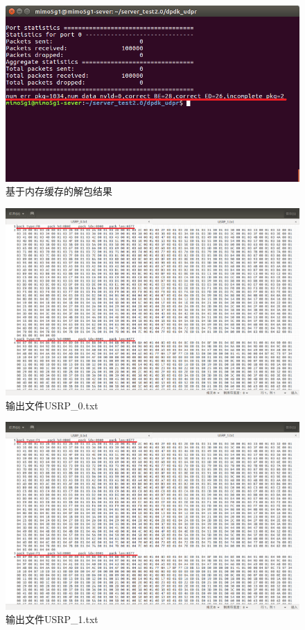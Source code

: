 \documentclass{article}
\begin{document}
\begin{figure}[H]
	\centering
	\includegraphics[width = .9\textwidth]{success.png}
	\caption{基于内存缓存的解包结果}
\end{figure}

\begin{figure}[H]
	\centering
	\includegraphics[width = .9\textwidth]{USRP_0.png}
	\caption{输出文件USRP\_0.txt}
\end{figure}

\begin{figure}[H]
	\centering
	\includegraphics[width = .9\textwidth]{USRP_1.png}
	\caption{输出文件USRP\_1.txt}
\end{figure}
\end{document}
